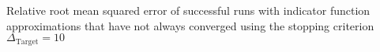 Relative root mean squared error of successful runs with indicator function approximations that have not always converged using the stopping criterion $\Delta_{\text{Target}} = 10$